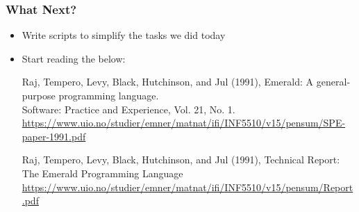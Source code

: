 \begin{frame}

\frametitle{What Next?}

\begin{itemize}

\item Write scripts to simplify the tasks we did today

\item Start reading the below:

\begin{thebibliography}{Dijkstra, 1982}

 Raj, Tempero, Levy, Black,
Hutchinson, and Jul (1991), Emerald: A general‐purpose programming
language.\\ Software: Practice and Experience, Vol. 21, No.  1.\\
{\tiny
\url{https://www.uio.no/studier/emner/matnat/ifi/INF5510/v15/pensum/SPE-paper-1991.pdf}}

 Raj, Tempero, Levy, Black,
Hutchinson, and Jul (1991), Technical Report: The Emerald Programming
Language\\ {\tiny
\url{https://www.uio.no/studier/emner/matnat/ifi/INF5510/v15/pensum/Report.pdf}}

\end{thebibliography}

\end{itemize}

\end{frame}
